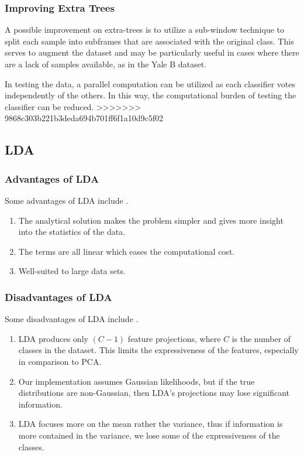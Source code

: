 \subsubsection{Improving Extra Trees}

A possible improvement on extra-trees is to utilize a sub-window technique to split each sample into subframes that are associated with the original class. This serves to augment the dataset and may be particularly useful in cases where there are a lack of samples available, as in the Yale B dataset.

In testing the data, a parallel computation can be utilized as each classifier votes independently of the others. In this way, the computational burden of testing the classifier can be reduced.
>>>>>>> 9868c303b221b3deda694b701ff6f1a10d9c5f02

\subsection{LDA}
\subsubsection{Advantages of LDA}
Some advantages of LDA include \cite{book:advlda}.
%
\begin{enumerate}
	\item The analytical solution makes the problem simpler and gives more insight into the statistics of the data.
	\item The terms are all linear which eases the computational cost.
	\item Well-suited to large data sets.
\end{enumerate}

\subsubsection{Disadvantages of LDA}

Some disadvantages of LDA include \cite{notes:dislda}.
%
\begin{enumerate}
	\item LDA produces only $(C-1)$ feature projections, where $C$ is the number of classes in the dataset. This limits the expressiveness of the features, especially in comparison to PCA. 
	\item Our implementation assumes Gaussian likelihoods, but if the true distributions are non-Gaussian, then LDA's projections may lose significant information.
	\item LDA focuses more on the mean rather the variance, thus if information is more contained in the variance, we lose some of the expressiveness of the classes.
\end{enumerate}

